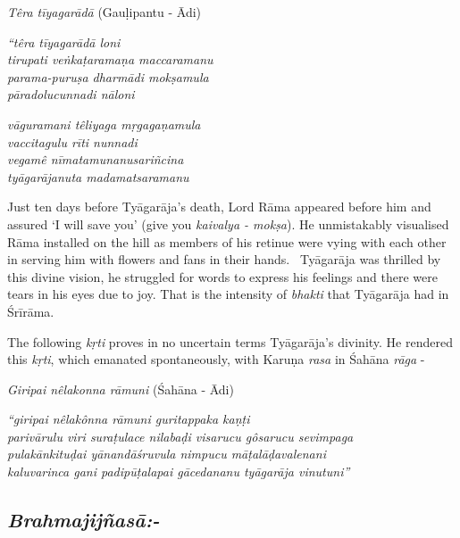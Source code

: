 \textit{Têra tīyagarādā} (Gauḷipantu - Ādi)

\begin{centerquote}
\textit{“têra tīyagarādā loni}\\ \textit{tirupati veṅkaṭaramaṇa maccaramanu}\\ \textit{parama-puruṣa dharmādi mokṣamula}\\ \textit{pāradolucunnadi nāloni}
\end{centerquote}

\begin{centerquote}
\textit{vāguramani têliyaga mṛgagaṇamula}\\ \textit{vaccitagulu rīti nunnadi}\\ \textit{vegamê nīmatamunanusariñcina}\\ \textit{tyāgarājanuta madamatsaramanu}
\end{centerquote}

Just ten days before Tyāgarāja’s death, Lord Rāma appeared before him and assured ‘I will save you’ (give you \textit{kaivalya - mokṣa}). He unmistakably visualised Rāma installed on the hill as members of his retinue were vying with each other in serving him with flowers and fans in their hands.  Tyāgarāja was thrilled by this divine vision, he struggled for words to express his feelings and there were tears in his eyes due to joy. That is the intensity of \textit{bhakti} that Tyāgarāja had in Śrīrāma.

The following \textit{kṛti} proves in no uncertain terms Tyāgarāja’s divinity. He rendered this \textit{kṛti}, which emanated spontaneously, with Karuṇa \textit{rasa} in Śahāna \textit{rāga} - 

\textit{Giripai nêlakonna rāmuni} (Śahāna - Ādi)

\begin{longquote}
\textit{“giripai nêlakônna rāmuni guritappaka kaṇṭi} \\ \textit{parivārulu viri suraṭulace nilabaḍi visarucu gôsarucu sevimpaga}\\ \textit{pulakānkituḍai yānandāśruvula nimpucu māṭalāḍavalenani}\\ \textit{kaluvarinca gani padipūṭalapai gācedananu tyāgarāja vinutuni”}
\end{longquote}


\subsection*{\textit{Brahmajijñasā:-}}

